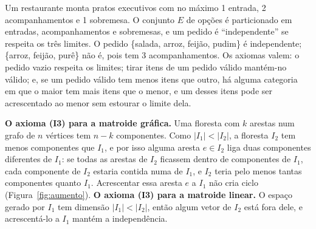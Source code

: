 \begin{exemplo}\label{ex:particao}
Um restaurante monta pratos executivos com no máximo 1 entrada, 2 acompanhamentos e 1 sobremesa. O conjunto $E$ de opções é particionado em entradas, acompanhamentos e sobremesas, e um pedido é ``independente'' se respeita os três limites. O pedido \{salada, arroz, feijão, pudim\} é independente; \{arroz, feijão, purê\} não é, pois tem 3 acompanhamentos. Os axiomas valem: o pedido vazio respeita os limites; tirar itens de um pedido válido mantém-no válido; e, se um pedido válido tem menos itens que outro, há alguma categoria em que o maior tem mais itens que o menor, e um desses itens pode ser acrescentado ao menor sem estourar o limite dela.
\end{exemplo}

\textbf{O axioma (I3) para a matroide gráfica.} Uma floresta com $k$ arestas num grafo de $n$ vértices tem $n-k$ componentes. Como $|I_1|<|I_2|$, a floresta $I_2$ tem menos componentes que $I_1$, e por isso alguma aresta $e\in I_2$ liga duas componentes diferentes de $I_1$: se todas as arestas de $I_2$ ficassem dentro de componentes de $I_1$, cada componente de $I_2$ estaria contida numa de $I_1$, e $I_2$ teria pelo menos tantas componentes quanto $I_1$. Acrescentar essa aresta $e$ a $I_1$ não cria ciclo (Figura~\ref{fig:aumento}).
\textbf{O axioma (I3) para a matroide linear.} O espaço gerado por $I_1$ tem dimensão $|I_1|<|I_2|$, então algum vetor de $I_2$ está fora dele, e acrescentá-lo a $I_1$ mantém a independência.

\begin{figura}[O axioma de aumento na matroide gráfica. A floresta $I_1=\{12,34\}$ (azul) tem 3 componentes; a floresta $I_2=\{13,35,24\}$ (vermelho tracejado), com uma aresta a mais, tem só 2. A aresta $35$ de $I_2$ liga duas componentes de $I_1$ e pode ser acrescentada a ela sem formar ciclo (à direita).\label{fig:aumento}]
\end{figura}

